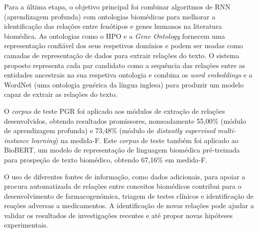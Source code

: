 Para a última etapa, o objetivo principal foi combinar algoritmos de RNN (aprendizagem profunda) com ontologias biomédicas para melhorar a identificação das relações entre fenótipos e genes humanos na literatura biomédica. As ontologias como o HPO e a \textit{Gene Ontology} fornecem uma representação confiável dos seus respetivos domínios e podem ser usadas como camadas de representação de dados para extrair relações do texto. O sistema proposto representa cada par candidato como a sequência das relações entre as entidades ancestrais na sua respetiva ontologia e combina os \textit{word embeddings} e a WordNet (uma ontologia genérica da língua inglesa) para produzir um modelo capaz de extrair as relações do texto.

O \textit{corpus} de teste PGR foi aplicado aos módulos de extração de relações desenvolvidos, obtendo resultados promissores, nomeadamente 55,00\% (módulo de aprendizagem profunda) e 73,48\% (módulo de \textit{distantly supervised multi-instance learning}) na medida-F. Este \textit{corpus} de teste também foi aplicado ao BioBERT, um modelo de representação de linguagem biomédica pré-treinada para prospeção de texto biomédico, obtendo 67,16\% em medida-F. 

O uso de diferentes fontes de informação, como dados adicionais, para apoiar a procura automatizada de relações entre conceitos biomédicos contribui para o desenvolvimento de farmacogenómica, triagem de testes clínicos e identificação de reações adversas a medicamentos. A identificação de novas relações pode ajudar a validar os resultados de investigações recentes e até propor novas hipóteses experimentais.
